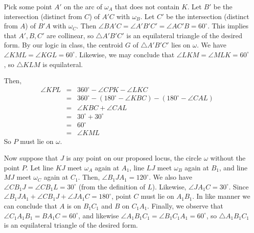 \begin{mdsoln}
Pick some point $A'$ on the arc of $\omega_A$ that does not contain $K$. Let $B'$ be the intersection (distinct from $C$) of $A'C$ with $\omega_B$. Let $C'$ be the intersection (distinct from $A$) of $B'A$ with $\omega_C$. Then $\angle BA'C=\angle A'B'C'=\angle AC'B=60^\circ$. This implies that $A',B,C'$ are collinear, so $\triangle A'B'C'$ is an equilateral triangle of the desired form. By our logic in class, the centroid $G$ of $\triangle A'B'C'$ lies on $\omega$. We have $\angle KML=\angle KGL=60^\circ$. Likewise, we may conclude that $\angle LKM=\angle MLK=60^\circ$, so $\triangle KLM$ is equilateral.

Then,\begin{eqnarray*}\angle KPL&=&360^\circ-\angle CPK-\angle LKC\\ &=&360^\circ-(180^\circ-\angle KBC)-(180^\circ-\angle CAL)\\ &=&\angle KBC+\angle CAL\\ &=&30^\circ+30^\circ\\ &=&60^\circ\\ &=&\angle KML\end{eqnarray*}So $P$ must lie on $\omega$.

Now suppose that $J$ is any point on our proposed locus, the circle $\omega$ without the point $P$. Let line $KJ$ meet $\omega_A$ again at $A_1$, line $LJ$ meet $\omega_B$ again at $B_1$, and line $MJ$ meet $\omega_C$ again at $C_1$. Then, $\angle B_1JA_1=120^\circ$. We also have $\angle CB_1J=\angle CB_1L=30^\circ$ (from the definition of $L$). Likewise, $\angle JA_1C=30^\circ$. Since $\angle B_1JA_1+\angle CB_1J+\angle JA_1C=180^\circ$, point $C$ must lie on $A_1B_1$. In like manner we can conclude that $A$ is on $B_1C_1$ and $B$ on $C_1A_1$. Finally, we observe that $\angle C_1A_1B_1=BA_1C=60^\circ$, and likewise $\angle A_1B_1C_1=\angle B_1C_1A_1=60^\circ$, so $\triangle A_1B_1C_1$ is an equilateral triangle of the desired form.
\end{mdsoln}


